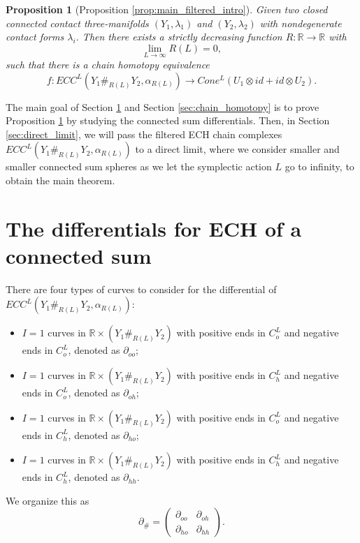 \documentclass{article}
\numberwithin{equation}{section}
\newtheorem{proposition}[theorem]{Proposition}
\theoremstyle{definition}
\newcommand{\R}{\mathbb{R}}
\begin{document}
\begin{proposition}[Proposition \ref{prop:main_filtered_intro}]
\label{prop:main_filtered}
Given two closed connected contact three-manifolds $(Y_1, \lambda_1)$ and $(Y_2, \lambda_2)$ with nondegenerate contact forms $\lambda_i$. Then there exists a strictly decreasing function $R: \R \to \R$ with $$\lim_{L\to \infty} R(L) = 0,$$
such that there is a chain homotopy equivalence 
$$f: ECC^L(Y_1 \#_{R(L)} Y_2, \alpha_{R(L)}) \to Cone^L(U_1 \otimes id + id \otimes U_2).$$
\end{proposition}
The main goal of Section \ref{sec:differentials} and Section \ref{sec:chain_homotopy} is to prove Proposition \ref{prop:main_filtered} by studying the connected sum differentials. Then, in Section \ref{sec:direct_limit}, we will pass the filtered ECH chain complexes $ECC^L(Y_1 \#_{R(L)} Y_2, \alpha_{R(L)})$ to a direct limit, where we consider smaller and smaller connected sum spheres as we let the symplectic action $L$ go to infinity, to obtain the main theorem.

\section{The differentials for ECH of a connected sum}
\label{sec:differentials}
There are four types of curves to consider for the differential of $ECC^L(Y_1 \#_{R(L)} Y_2, \alpha_{R(L)})$: 
\begin{itemize}
    \item $I = 1$ curves in $\R \times (Y_1 \#_{R(L)} Y_2)$ with positive ends in $C_o^L$ and negative ends in $C_o^L$, denoted as $\partial_{oo}$; 
    \item $I = 1$ curves in $\R \times (Y_1 \#_{R(L)} Y_2)$ with positive ends in $C_h^L$ and negative ends in $C_o^L$, denoted as $\partial_{oh}$; 
    \item $I = 1$ curves in $\R \times (Y_1 \#_{R(L)} Y_2)$ with positive ends in $C_o^L$ and negative ends in $C_h^L$, denoted as $\partial_{ho}$; 
    \item $I = 1$ curves in $\R \times (Y_1 \#_{R(L)} Y_2)$ with positive ends in $C_h^L$ and negative ends in $C_h^L$, denoted as $\partial_{hh}$. 
\end{itemize}
We organize this as
$$\partial_\# = \begin{pmatrix}
\partial_{oo} & \partial_{oh}\\
\partial_{ho} & \partial_{hh}
\end{pmatrix}.$$
\end{document}
